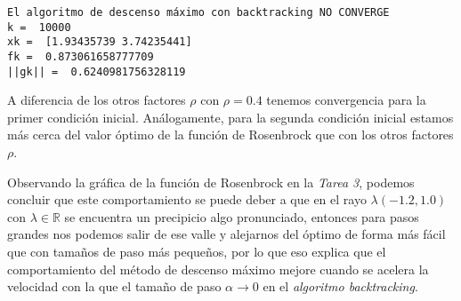 \documentclass[11pt]{article}
\begin{document}
    \begin{Verbatim}[commandchars=\\\{\}]
El algoritmo de descenso máximo con backtracking NO CONVERGE
k =  10000
xk =  [1.93435739 3.74235441]
fk =  0.873061658777709
||gk|| =  0.6240981756328119
    \end{Verbatim}

    A diferencia de los otros factores \(\rho\) con \(\rho=0.4\) tenemos
convergencia para la primer condición inicial. Análogamente, para la
segunda condición inicial estamos más cerca del valor óptimo de la
función de Rosenbrock que con los otros factores \(\rho\).

Observando la gráfica de la función de Rosenbrock en la \emph{Tarea 3},
podemos concluir que este comportamiento se puede deber a que en el rayo
\(\lambda (-1.2,1.0)\) con \(\lambda\in \mathbb{R}\) se encuentra un
precipicio algo pronunciado, entonces para pasos grandes nos podemos
salir de ese valle y alejarnos del óptimo de forma más fácil que con
tamaños de paso más pequeños, por lo que eso explica que el
comportamiento del método de descenso máximo mejore cuando se acelera la
velocidad con la que el tamaño de paso \(\alpha\to 0\) en el
\emph{algoritmo backtracking}.


    
    
    
\end{document}
